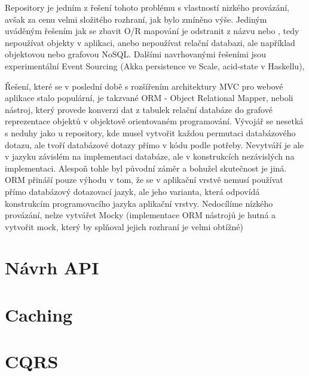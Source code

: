 \documentclass[11pt]{article}
\begin{document}
Repository je jedním z řešení tohoto problému s vlastností nizkého provázání,
avšak za cenu velmi složitého rozhraní, jak bylo zmíněno výše. Jediným uváděným
řešením jak se zbavit O/R mapování je odstranit z názvu  nebo ,
tedy nepoužívat objekty v aplikaci, anebo nepoužívat relační databazi, ale
například objektovou nebo grafovou NoSQL. Dalšími navrhovanými řešeními jsou
experimentální Event Sourcing (Akka persistence ve Scale, acid-state v
Haskellu),

Řešení, které se v poslední době s rozšířením architektury MVC pro webové
aplikace stalo populární, je takzvané ORM - Object Relational Mapper, neboli
nástroj, který provede konverzi dat z tabulek relační databáze do grafové
reprezentace objektů v objektově orientovaném programování. Vývojář se nesetká
s neduhy jako u repository, kde musel vytvořit každou permutaci databázového
dotazu, ale tvoří databázové dotazy přímo v kódu podle potřeby. Nevytváří je
ale v jazyku závislém na implementaci databáze, ale v konstrukcích nezávislých
na implementaci. Alespoň tohle byl původní záměr a bohužel skutečnost je jiná.
ORM přináší pouze výhodu v tom, že se v aplikační vrstvě nemusí používat přímo
databázový dotazovací jazyk, ale jeho varianta, která odpovídá konstrukcím
programovacího jazyka aplikační vrstvy. Nedocílíme nízkého provázání, nelze
vytvářet Mocky (implementace ORM nástrojů je hutná a vytvořit mock, který by
splňoval jejich rozhraní je velmi obtížné)

\section{Návrh API}
\section{Caching}
\section{CQRS}




\end{document}
